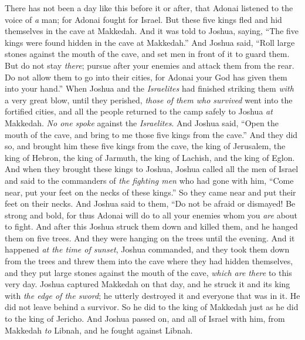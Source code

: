 \begin{biblechapter}
\verse There has not been a day like this before it or after, that Adonai listened to the voice of \textit{a} man; for Adonai fought for Israel.
 But these five kings fled and hid themselves in the cave at Makkedah.
\verse And it was told to Joshua, saying, “The five kings were found hidden in the cave at Makkedah.”
\verse And Joshua said, “Roll large stones against the mouth of the cave, and set men in front of it to guard them.
\verse But do not stay \textit{there}; pursue after your enemies and attack them from the rear. Do not allow them to go into their cities, for Adonai your God has given them into your hand.”
\verse When Joshua and the \textit{Israelites} had finished striking them \textit{with} a very great blow, until they perished, \textit{those of them who survived} went into the fortified cities,
\verse and all the people returned to the camp safely to Joshua \textit{at} Makkedah. \textit{No one spoke} against the \textit{Israelites}.
\verse And Joshua said, “Open the mouth of the cave, and bring to me those five kings from the cave.”
\verse And they did so, and brought him these five kings from the cave, the king of Jerusalem, the king of Hebron, the king of Jarmuth, the king of Lachish, and the king of Eglon.
\verse And when they brought these kings to Joshua, Joshua called all the men of Israel and said to the commanders of \textit{the fighting men} who had gone with him, “Come near, put your feet on the necks of these kings.” So they came near and put their feet on their necks.
\verse And Joshua said to them, “Do not be afraid or dismayed! Be strong and bold, for thus Adonai will do to all your enemies whom you \textit{are} about to fight.
\verse And after this Joshua struck them down and killed them, and he hanged them on five trees. And they were hanging on the trees until the evening.
\verse And it happened \textit{at the time of sunset}, Joshua commanded, and they took them down from the trees and threw them into the cave where they had hidden themselves, and they put large stones against the mouth of the cave, \textit{which are there} to this very day.
\verse Joshua captured Makkedah on that day, and he struck it and its king with \textit{the edge of the sword}; he utterly destroyed it and everyone that was in it. He did not leave behind a survivor. So he did to the king of Makkedah just as he did to the king of Jericho.
 And Joshua passed on, and all of Israel with him, from Makkedah \textit{to} Libnah, and he fought against Libnah.

\end{biblechapter}
